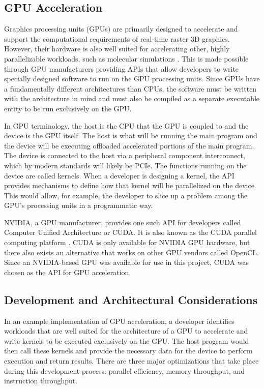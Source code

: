 \documentclass[conference, twoside]{IEEEtran}
\begin{document}
\subsection{GPU Acceleration} %

Graphics processing units (GPUs) are primarily designed to accelerate and support the computational requirements of real-time raster 3D graphics. However, their hardware is also well suited for accelerating other, highly parallelizable workloads, such as molecular simulations \cite{electronic-structure-calculations-on-gpus}. This is made possible through GPU manufacturers providing APIs that allow developers to write specially designed software to run on the GPU processing units. Since GPUs have a fundamentally different architectures than CPUs, the software must be written with the architecture in mind and must also be compiled as a separate executable entity to be run exclusively on the GPU.

In GPU terminology, the host is the CPU that the GPU is coupled to and the device is the GPU itself. The host is what will be running the main program and the device will be executing offloaded accelerated portions of the main program. The device is connected to the host via a peripheral component interconnect, which by modern standards will likely be PCIe. The functions running on the device are called kernels. When a developer is designing a kernel, the API provides mechanisms to define how that kernel will be parallelized on the device. This would allow, for example, the developer to slice up a problem among the GPU's processing units in a programmatic way.

NVIDIA, a GPU manufacturer, provides one such API for developers called Computer Unified Architecture or CUDA. It is also known as the CUDA parallel computing platform \cite{nvidia-cuda}. CUDA is only available for NVIDIA GPU hardware, but there also exists an alternative that works on other GPU vendors called OpenCL. Since an NVIDIA-based GPU was available for use in this project, CUDA was chosen as the API for GPU acceleration.

\subsection{Development and Architectural Considerations} %

In an example implementation of GPU acceleration, a developer identifies workloads that are well suited for the architecture of a GPU to accelerate and write kernels to be executed exclusively on the GPU. The host program would then call these kernels and provide the necessary data for the device to perform execution and return results. There are three major optimizations that take place during this development process: parallel efficiency, memory throughput, and instruction throughput.
\end{document}
